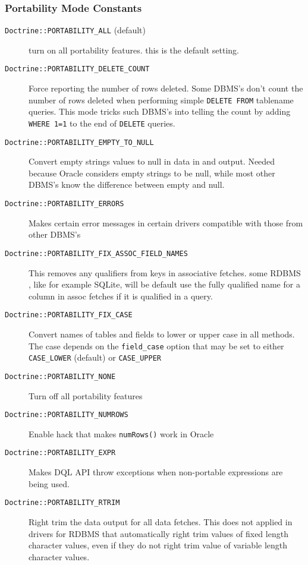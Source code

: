 \documentclass[11pt,a4paper]{report}
\begin{document}
\subsubsection{Portability Mode Constants}
\begin{description}
\item[\texttt{Doctrine::PORTABILITY\_ALL} (default)] {turn on all portability features. this is the default setting.}
\item[\texttt{Doctrine::PORTABILITY\_DELETE\_COUNT}] {Force reporting the number of rows deleted. Some DBMS's don't count the number of rows deleted when performing simple \texttt{DELETE FROM} tablename queries. This mode tricks such DBMS's into telling the count by adding \texttt{WHERE 1=1} to the end of \texttt{DELETE} queries.}
\item[\texttt{Doctrine::PORTABILITY\_EMPTY\_TO\_NULL}] {Convert empty strings values to null in data in and output. Needed because Oracle considers empty strings to be null, while most other DBMS's know the difference between empty and null.}
\item[\texttt{Doctrine::PORTABILITY\_ERRORS}] {Makes certain error messages in certain drivers compatible with those from other DBMS's}
\item[\texttt{Doctrine::PORTABILITY\_FIX\_ASSOC\_FIELD\_NAMES}] {This removes any qualifiers from keys in associative fetches. some RDBMS , like for example SQLite, will be default use the fully qualified name for a column in assoc fetches if it is qualified in a query.}
\item[\texttt{Doctrine::PORTABILITY\_FIX\_CASE}] {Convert names of tables and fields to lower or upper case in all methods. The case depends on the \texttt{field\_case} option that may be set to either \texttt{CASE\_LOWER} (default) or \texttt{CASE\_UPPER}}
\item[\texttt{Doctrine::PORTABILITY\_NONE}] {Turn off all portability features}
\item[\texttt{Doctrine::PORTABILITY\_NUMROWS}] {Enable hack that makes \texttt{numRows()} work in Oracle}
\item[\texttt{Doctrine::PORTABILITY\_EXPR}] {Makes DQL API throw exceptions when non-portable expressions are being used.}
\item[\texttt{Doctrine::PORTABILITY\_RTRIM}] {Right trim the data output for all data fetches. This does not applied in drivers for RDBMS that automatically right trim values of fixed length character values, even if they do not right trim value of variable length character values.}
\end{description}
\end{document}
